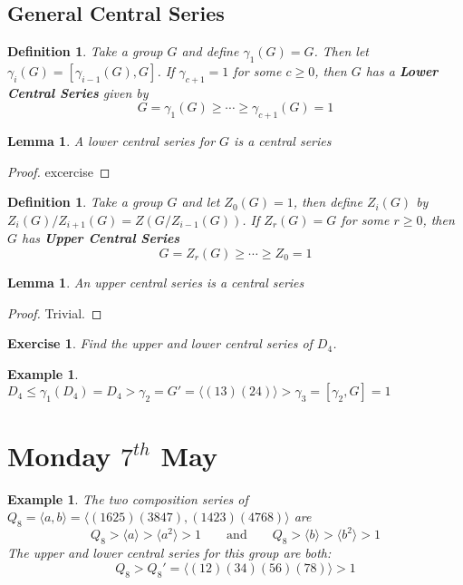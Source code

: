 \documentclass[a4paper,10pt]{article}
\newtheorem{Def}[thm]{Definition}
\newtheorem{eg}[thm]{Example}
\newtheorem{Ex}[thm]{Exercise}
\newtheorem{Lem}[thm]{Lemma}
\begin{document}
\subsection{General Central Series}

\begin{Def}
Take a group $G$ and define $\gamma_1 (G) = G$. Then let $\gamma_i (G) = [\gamma_{i-1} (G), G]$. If $\gamma_{c+1} = 1$ for some $c \geq 0$, then $G$ has a \textbf{Lower Central Series} given by
\[ G = \gamma_1(G) \geq \cdots \geq \gamma_{c+1}(G) = 1 \]
\end{Def}

\begin{Lem}
A lower central series for $G$ is a central series
\end{Lem}

\begin{proof}
excercise
\end{proof}

\begin{Def}
Take a group $G$ and let $Z_0(G) = 1$, then define $Z_i(G)$ by $Z_i(G) / Z_{i+1}(G) = Z( G / Z_{i-1}(G) )$. If $Z_r(G) = G$ for some $r \geq 0$, then $G$ has \textbf{Upper Central Series} 
\[ G = Z_r(G) \geq \cdots \geq Z_0 = 1 \]
\end{Def}

\begin{Lem}
An upper central series is a central series
\end{Lem}

\begin{proof}
Trivial.
\end{proof}


\begin{Ex}
Find the upper and lower central series of $D_4$. 
\end{Ex}

\begin{eg}
$D_4 \leq \gamma_1(D_4) = D_4 > \gamma_2 = G' = \langle (13)(24) \rangle > \gamma_3 = [\gamma_2 , G] = 1$
\end{eg}





\newpage
\section{Monday $7^{th}$ May}

\begin{eg}
The two composition series of $Q_8 = \langle a, b\rangle = \langle (1625)(3847), (1423)(4768) \rangle$ are
\[ Q_8 > \langle a \rangle > \langle a^2 \rangle > 1 \qquad \text{and} \qquad Q_8 > \langle b \rangle > \langle b^2 \rangle > 1 \]
The upper and lower central series for this group are both:
\[ Q_8 > Q_8' = \langle (12)(34)(56)(78) \rangle > 1 \]
\end{eg}
\end{document}
